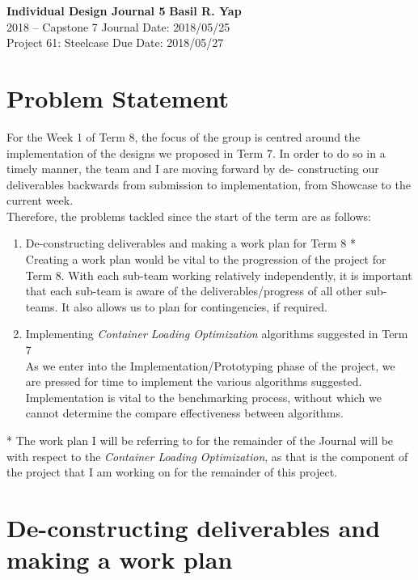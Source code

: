 \documentclass[a4paper, 11pt]{article}
\begin{document}
\noindent
\large\textbf{Individual Design Journal 5} \hfill \textbf{Basil R. Yap} \\
2018 -- Capstone 7 \hfill Journal Date: 2018/05/25 \\
Project 61: Steelcase \hfill Due Date: 2018/05/27

\section*{Problem Statement}

For the Week 1 of Term 8, the focus of the group is centred around the implementation of the designs we proposed in Term 7. In order to do so in a timely manner, the team and I are moving forward by de-
constructing our deliverables backwards from submission to implementation, from Showcase to the current week.\\

Therefore, the problems tackled since the start of the term are as follows:\begin{enumerate}[label=\alph*)]
\item De-constructing deliverables and making a work plan for Term 8 *\\

Creating a work plan would be vital to the progression of the project for Term 8. With each sub-team working relatively independently, it is important that each sub-team is aware of the deliverables/progress of all other sub-teams. It also allows us to plan for contingencies, if required.
\item Implementing \textit{Container Loading Optimization} algorithms suggested in Term 7\\

As we enter into the Implementation/Prototyping phase of the project, we are pressed for time to implement the various algorithms suggested. Implementation is vital to the benchmarking process, without which we cannot determine the compare effectiveness between algorithms.
\end{enumerate} 

* The work plan I will be referring to for the remainder of the Journal will be with respect to the \textit{Container Loading Optimization}, as that is the component of the project that I am working on for the remainder of this project.

\section*{De-constructing deliverables and making a work plan}
\end{document}
